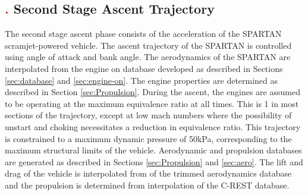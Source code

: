 \subsection{\textcolor{red}{.} Second Stage Ascent Trajectory}
The second stage ascent phase consists of the acceleration of the SPARTAN scramjet-powered vehicle. 
The ascent trajectory of the SPARTAN is controlled using angle of attack and bank angle. The aerodynamics of the SPARTAN are interpolated from the engine on database developed as described in Sections \ref{sec:database} and \ref{sec:engine-on}. The engine properties are determined as described in Section \ref{sec:Propulsion}.
During the ascent, the engines are assumed to be operating at the maximum equivalence ratio at all times. This is 1 in most sections of the trajectory, except at low mach numbers where the possibility of unstart and choking necessitates a reduction in equivalence ratio. This trajectory is constrained to a maximum dynamic pressure of 50kPa, corresponding to the maximum structural limits of the vehicle. Aerodynamic and propulsion databases are generated as described in Sections \ref{sec:Propulsion} and \ref{sec:aero}. The lift and drag of the vehicle is interpolated from of the trimmed aerodynamics database and the propulsion is determined from interpolation of the C-REST database. 

